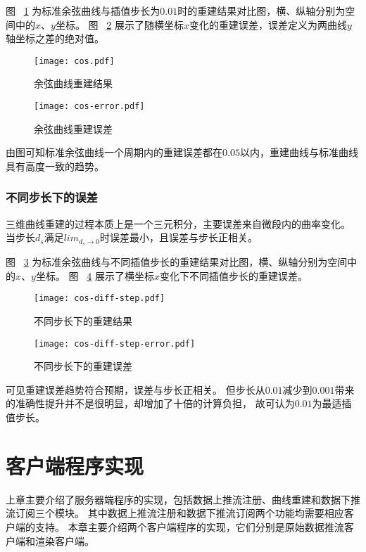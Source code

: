 图 ~\ref{fig:cos} 为标准余弦曲线与插值步长为$0.01$时的重建结果对比图，横、纵轴分别为空间中的$x$、$y$坐标。
图 ~\ref{fig:cos-error} 展示了随横坐标$x$变化的重建误差，误差定义为两曲线$y$轴坐标之差的绝对值。

\FloatBarrier
\begin{figure}
\centering
\texttt{[image: cos.pdf]}
\caption{余弦曲线重建结果}
\label{fig:cos}
\end{figure}

\begin{figure}
\centering
\texttt{[image: cos-error.pdf]}
\caption{余弦曲线重建误差}
\label{fig:cos-error}
\end{figure}
\FloatBarrier

由图可知标准余弦曲线一个周期内的重建误差都在$0.05$以内，重建曲线与标准曲线具有高度一致的趋势。

\subsubsection{不同步长下的误差}

三维曲线重建的过程本质上是一个三元积分，主要误差来自微段内的曲率变化。
当步长$d_s$满足$lim_{d_s \rightarrow 0}$时误差最小，且误差与步长正相关。


图 ~\ref{fig:cos-diff-step} 为标准余弦曲线与不同插值步长的重建结果对比图，横、纵轴分别为空间中的$x$、$y$坐标。
图 ~\ref{fig:cos-diff-step-error} 展示了横坐标$x$变化下不同插值步长的重建误差。

\FloatBarrier
\begin{figure}
\centering
\texttt{[image: cos-diff-step.pdf]}
\caption{不同步长下的重建结果}
\label{fig:cos-diff-step}
\end{figure}

\begin{figure}
\centering
\texttt{[image: cos-diff-step-error.pdf]}
\caption{不同步长下的重建误差}
\label{fig:cos-diff-step-error}
\end{figure}
\FloatBarrier

可见重建误差趋势符合预期，误差与步长正相关。
但步长从$0.01$减少到$0.001$带来的准确性提升并不是很明显，却增加了十倍的计算负担，
故可认为$0.01$为最适插值步长。

\clearpage

\section{客户端程序实现}
\label{sec:client}
上章主要介绍了服务器端程序的实现，包括数据上推流注册、曲线重建和数据下推流订阅三个模块。
其中数据上推流注册和数据下推流订阅两个功能均需要相应客户端的支持。
本章主要介绍两个客户端程序的实现，它们分别是原始数据推流客户端和渲染客户端。

